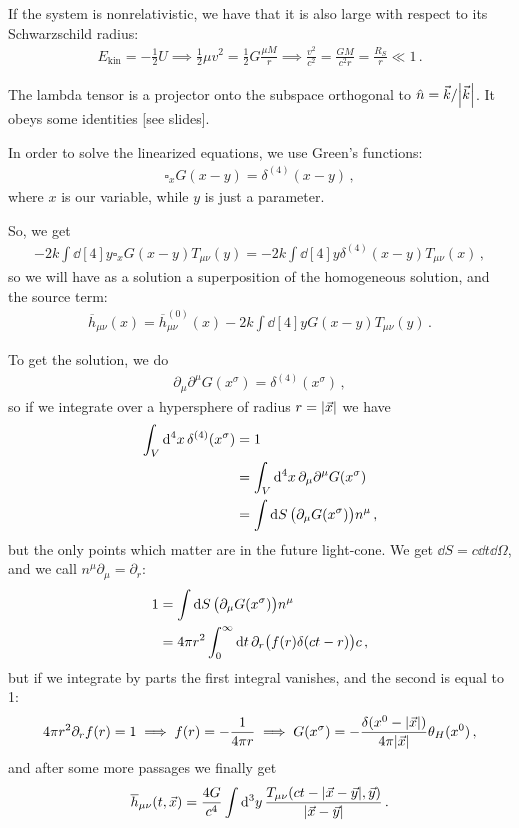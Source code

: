 \documentclass[main.tex]{subfiles}
\begin{document}
If the system is nonrelativistic, we have that it is also large with respect to its Schwarzschild radius:
%
\begin{align}
E _{\text{kin}} = - \frac{1}{2} U \implies 
\frac{1}{2} \mu v^2 = \frac{1}{2} G \frac{\mu M}{r} \implies \frac{v^2}{c^2} = \frac{GM}{c^2 r} = \frac{R_S}{r} \ll 1
\,.
\end{align}

The lambda tensor is a projector onto the subspace orthogonal to \(\hat{n} = \vec{k} / \abs{\vec{k}}\). 
It obeys some identities [see slides].

In order to solve the linearized equations, we use Green's functions: 
%
\begin{align}
\square_x G(x -y) = \delta^{(4)} (x-y)
\,,
\end{align}
%
where \(x\) is our variable, while \(y\) is just a parameter. 

So, we get 
%
\begin{align}
-2k \int \dd[4]{y} \square_x G(x-y) T_{\mu \nu } (y) = -2k \int \dd[4]{y} \delta^{(4)} (x-y) T_{\mu \nu }(x)
\,,
\end{align}
%
so we will have as a solution a superposition of the homogeneous solution, and the source term:
%
\begin{align}
\overline{h}_{\mu \nu } (x) = \overline{h}^{(0)}_{\mu \nu }(x)
- 2k \int \dd[4]{y} G(x-y) T_{\mu \nu }(y)
\,.
\end{align}

To get the solution, we do 
%
\begin{align}
\partial_{\mu } \partial^{\mu } G(x^{\sigma }) = \delta^{(4)} (x^{\sigma })
\,,
\end{align}
%
so if we integrate over a hypersphere of radius \(r = \abs{\vec{x}}\) we have 
%
\begin{align}
\int_V \dd[4]{x} \delta^{(4)} (x^{\sigma }) &= 1  \\
&= \int_{V} \dd[4]{x} \partial_{\mu } \partial^{\mu } G(x^{\sigma })  \\
&= \int \dd{S} \qty(\partial_{\mu } G(x^{\sigma })) n^{\mu } 
\,,
\end{align}
%
but the only points which matter are in the future light-cone. We get \(\dd{S} = c \dd{t}  \dd{\Omega }\), and we call \(n^{\mu } \partial_{\mu } = \partial_{r}\): 
%
\begin{align}
1 &= \int \dd{S} \qty(\partial_{\mu } G(x^{\sigma })) n^{\mu }  \\
&= 4 \pi r^2 \int_0^{ \infty } \dd{t} \partial_{r} \qty(f(r) \delta (ct-r) )c
\,,
\end{align}
%
but if we integrate by parts the first integral vanishes, and the second is equal to 1: 
%
\begin{align}
4 \pi r^2 \partial_{r} f(r) = 1 \implies 
f(r) = - \frac{1}{4 \pi r}
\implies G(x^{\sigma }) = - \frac{ \delta (x^{0} - \abs{\vec{x}})}{4 \pi \abs{\vec{x}}} \theta_H (x^{0})
\,,
\end{align}
%
and after some more passages we finally get 
%
\begin{align}
\overline{h}_{\mu \nu } 
(t, \vec{x}) = 
\frac{4G}{c^{4}}
\int \dd[3]{y} \frac{T_{\mu \nu } (ct - \abs{\vec{x}-\vec{y}}, \vec{y})}{\abs{\vec{x} - \vec{y}}}
\,.
\end{align}
\end{document}
